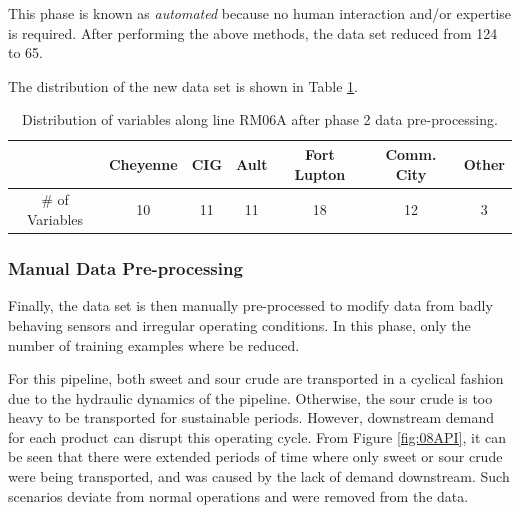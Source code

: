 This phase is known as \textit{automated} because no human interaction and/or expertise is required. After performing the above methods, the data set reduced from 124 to 65.  

The distribution of the new data set is shown in Table \ref{tab:08Ph2Data}.

\begin{table}[h]
    \centering
    {
    \begin{tabular}{ c | c | c | c | c | c | c}
             &  Cheyenne & CIG & Ault & Fort Lupton & Comm. City & Other      \\
        \hline
        \# of Variables  &  10  &  11  &  11  &  18  &  12  &  3  \\
    \end{tabular}}
    \caption{Distribution of variables along line RM06A after phase 2 data pre-processing.}
    \label{tab:08Ph2Data}
\end{table}

\subsubsection{Manual Data Pre-processing}
Finally, the data set is then manually pre-processed to modify data from badly behaving sensors and irregular operating conditions.  In this phase, only the number of training examples where be reduced.

For this pipeline, both sweet and sour crude are transported in a cyclical fashion due to the hydraulic dynamics of the pipeline. Otherwise, the sour crude is too heavy to be transported for sustainable periods. However, downstream demand for each product can disrupt this operating cycle.  From Figure \ref{fig:08API}, it can be seen that there were extended periods of time where only sweet or sour crude were being transported, and was caused by the lack of demand downstream.  Such scenarios deviate from normal operations and were removed from the data.

